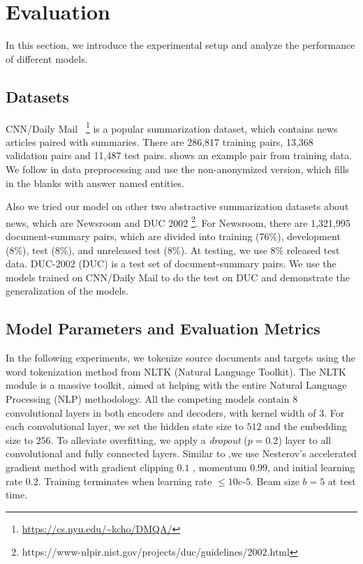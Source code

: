 \section{Evaluation}
\label{sec:eval}
In this section, we introduce the experimental setup
and analyze the performance of different models.

\subsection{Datasets}
CNN/Daily Mail~\citep{HermannKGEKSB15}
\footnote{\url{https://cs.nyu.edu/~kcho/DMQA/}} 
is a popular summarization dataset, 
which contains news articles paired with summaries.
There are 286,817 training pairs,
13,368 validation pairs and 11,487 test pairs.
 shows an example pair from training data.
We follow \cite{SeeLM17} in data preprocessing and use 
the non-anonymized version, which fills in the blanks with answer named entities.

Also we tried our model on other two abstractive summarization datasets about news, which are Newsroom \citep{Newsroom18} and DUC 2002 \footnote{https://www-nlpir.nist.gov/projects/duc/guidelines/2002.html}. For Newsroom, there are 1,321,995 document-summary pairs, which are divided into training (76\%), development (8\%), test (8\%), and unreleased test (8\%). At testing, we use 8\% released test data. DUC-2002 (DUC) is a test set of document-summary pairs. We use the models trained on CNN/Daily Mail to do the test on DUC and demonstrate the generalization of the models.


\subsection{Model Parameters and Evaluation Metrics}
\label{sec:expset}
In the following experiments, 
we tokenize source documents and targets 
using the word tokenization method from NLTK (Natural Language Toolkit). 
The NLTK module is a massive toolkit, 
aimed at helping with the entire Natural Language Processing (NLP) methodology.
All the competing models contain $8$ convolutional layers in
both encoders and decoders, with kernel width of $3$.
For each convolutional layer, 
we set the hidden state size to $512$ and the embedding size to $256$.
To alleviate overfitting,
we apply a \textit{dropout} ($p=0.2$) layer to 
all convolutional and fully connected layers.
Similar to \citep{gehring2017convs2s},we use Nesterov's
accelerated gradient method \citep{SutskeverMDH13} with gradient clipping $0.1$ \citep{PascanuMB13}, momentum $0.99$,
and initial learning rate $0.2$.
Training terminates when learning rate $\le 10e$-$5$.
Beam size $b=5$ at test time.

